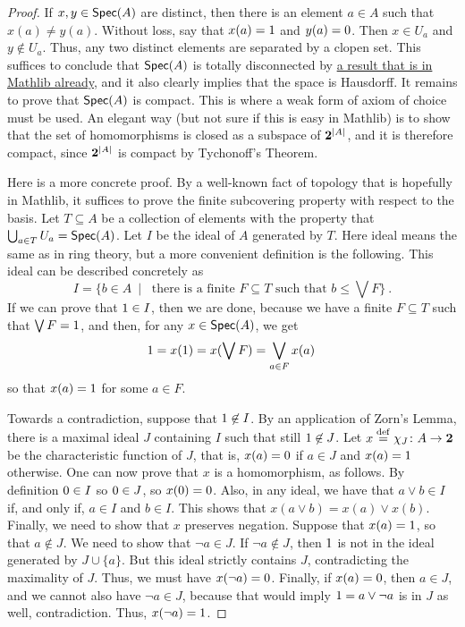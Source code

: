 \documentclass[a4paper]{article}
\begin{document}
\begin{proof}
    If $x, y \in \operatorname*{\mathsf{Spec}}(A)$ are distinct, then there is an element $a \in A$
    such that $x(a) \neq y(a)$. Without loss, say that $x(a) = 1$ and $y(a)
    = 0$. Then $x \in U_a$ and $y \not\in U_a$. Thus, any two distinct
    elements are separated by a clopen set. This suffices to conclude that
    $\operatorname*{\mathsf{Spec}}(A)$ is totally disconnected by
    \href{https://leanprover-community.github.io/mathlib4_docs/Mathlib/Topology/Connected/TotallyDisconnected.html#isTotallyDisconnected_of_isClopen_set}{
    a result that is in Mathlib already}, and it also clearly implies that the
    space is Hausdorff. It remains to prove that $\operatorname*{\mathsf{Spec}}(A)$ is compact. This is
    where a weak form of axiom of choice must be used. An elegant way (but not
    sure if this is easy in Mathlib) is to show that the set of homomorphisms
    is closed as a subspace of $\mathbf{2}^{|A|}$, and it is therefore compact,
    since $\mathbf{2}^{|A|}$ is compact by Tychonoff's Theorem. 

    Here is a more concrete proof. By a well-known fact of topology that is
    hopefully in Mathlib, it suffices to prove the finite subcovering property
    with respect to the basis.  Let $T \subseteq A$ be a collection of elements
    with the property that $\bigcup_{a \in T} U_a = \operatorname*{\mathsf{Spec}}(A)$. Let $I$ be the
    ideal of $A$ generated by $T$. Here ideal means the same as in ring theory,
    but a more convenient definition is the following. This ideal can be
    described concretely as $$I = \{ b \in A \ \mid \ \text{ there is a finite
    } F \subseteq T \text{ such that } b \leq \bigvee F\}\ . $$ If we can prove
    that $1 \in I$, then we are done, because we have a finite $F \subseteq
    T$ such that $\bigvee F = 1$, and then, for any $x \in \operatorname*{\mathsf{Spec}}(A)$, we get
    \[ 1 = x(1) = x(\bigvee F) = \bigvee_{a \in F} x(a) \, \] so that
    $x(a) = 1$ for some $a \in F$.

    Towards a contradiction, suppose that $1\not\in I$. By an application of
    Zorn's Lemma, there is a maximal ideal $J$ containing $I$ such that still
    $1\not\in J$. Let $x \stackrel{\mathrm{def}}{=} \chi_J \colon A \to \mathbf{2}$ be the characteristic function of $J$,
    that is, $x(a) = 0$ if $a \in J$ and $x(a) = 1$ otherwise. One can
    now prove that $x$ is a homomorphism, as follows. By definition $0 \in
    I$ so $0 \in J$, so $x(0) = 0$. Also, in any ideal, we have that
    $a \vee b \in I$ if, and only if, $a \in I$ and $b \in I$. This shows that
    $x(a \vee b) = x(a) \vee x(b)$. Finally, we need to show that $x$ preserves
    negation. Suppose that $x(a) = 1$, so that $a \not\in J$. We need to
    show that $\neg a \in J$. If $\neg a \not\in J$, then $1$ is not in the
    ideal generated by $J \cup \{a\}$. But this ideal strictly contains $J$,
    contradicting the maximality of $J$. Thus, we must have $x(\neg a) = 0$.
    Finally, if $x(a) = 0$, then $a \in J$, and we cannot also have $\neg a
    \in J$, because that would imply $1 = a \vee \neg a$ is in $J$ as well,
    contradiction. Thus, $x(\neg a) = 1$.
\end{proof}
\end{document}
